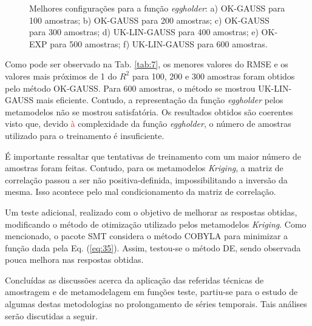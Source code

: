 \begin{figure}[H]
	\caption{Melhores configurações para a função \textit{eggholder}: a) OK-GAUSS para 100 amostras; b) OK-GAUSS para 200 amostras; c) OK-GAUSS para 300 amostras; d) UK-LIN-GAUSS para 400 amostras; e) OK-EXP para 500 amostras; f) UK-LIN-GAUSS para 600 amostras.} 
	\label{fig:egg2}
\end{figure}

Como pode ser observado na Tab. \ref{tab:7}, os menores valores do RMSE e os valores mais próximos de 1 do ${R}^2$ para 100, 200 e 300 amostras foram obtidos pelo método OK-GAUSS. Para 600 amostras, o método se mostrou UK-LIN-GAUSS mais eficiente. Contudo, a representação da função \textit{eggholder} pelos metamodelos não se mostrou satisfatória. Os resultados obtidos são coerentes visto que, devido \textcolor{red}{à} complexidade da função {\it eggholder}, o número de amostras utilizado para o treinamento é insuficiente. 

É importante ressaltar que tentativas de treinamento com um maior número de amostras foram feitas. Contudo, para os metamodelos \textit{Kriging}, a matriz de correlação passou a ser não positiva-definida, impossibilitando a inversão da mesma. Isso acontece pelo mal condicionamento da matriz de correlação.

Um teste adicional\textcolor{red}{,} realizado com o objetivo de melhorar as respostas obtidas, modificando o método de otimização utilizado pelos metamodelos {\it Kriging}. Como mencionado, o pacote SMT considera o método COBYLA para minimizar a função dada pela Eq. (\ref{eq:35}). Assim, testou-se o método DE, sendo observada pouca melhora nas respostas obtidas.

Concluídas as discussões acerca da aplicação das referidas técnicas de amostragem e de metamodelagem em funções teste, partiu-se para o estudo de algumas destas metodologias no prolongamento de séries temporais. Tais análises serão discutidas a seguir.




